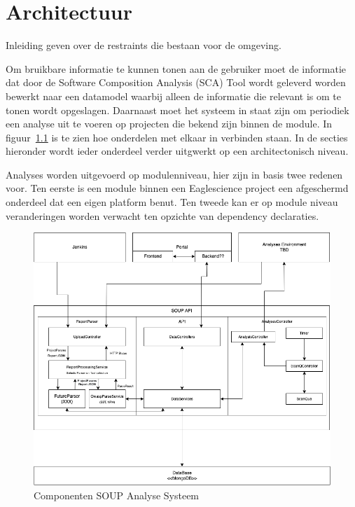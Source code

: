 \chapter{Architectuur}\label{ch:Architectuur}
Inleiding geven over de restraints die bestaan voor de omgeving.

Om bruikbare informatie te kunnen tonen aan de gebruiker moet de informatie dat door de Software Composition Analysis (SCA) Tool wordt geleverd worden bewerkt naar een datamodel waarbij alleen de informatie die relevant is om te tonen wordt opgeslagen. Daarnaast moet het systeem in staat zijn om periodiek een analyse uit te voeren op projecten die bekend zijn binnen de module. In figuur~\ref{fig:SOUP-Components} is te zien hoe onderdelen met elkaar in verbinden staan.
In de secties hieronder wordt ieder onderdeel verder uitgwerkt op een architectonisch niveau.

Analyses worden uitgevoerd op modulenniveau, hier zijn in basis twee redenen voor. Ten eerste is een module binnen een Eaglescience project een afgeschermd onderdeel dat een eigen platform benut. Ten tweede kan er op module niveau veranderingen worden verwacht ten opzichte van dependency declaraties.


\begin{figure}[bth]
    \myfloatalign
    \includegraphics[width=15cm]{gfx/SOUPAPI-SOUPAPI MODULES}
    \caption{Componenten SOUP Analyse Systeem}
    \label{fig:SOUP-Components}
\end{figure}
\newpage %


